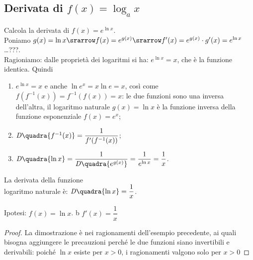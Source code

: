 \subsection{Derivata di $f(x)=\log_a x$}
\label{}
\begin{esempio}
  Calcola la derivata di $f(x)=e^{\ln x}$.\\
  Poniamo $g(x)=\ln x\srarrow f(x)=e^{g(x)}\srarrow f'(x)=e^{g(x)}\cdot 
g'(x)=
  e^{\ln x}$ \dots ???.\\
  Ragioniamo: dalle proprietà
  dei logaritmi si ha: $e^{\ln x} =x$, che è la funzione identica. Quindi
  \begin{enumerate}[noitemsep]
    \item $e^{\ln x} =x$ e anche $\ln e^x= x\ln e=x$, così come 
    $f(f^{-1}(x))=f^{-1}(f(x))=x$: le due funzioni sono una inversa 
dell'altra,
    il logaritmo naturale $g(x)=\ln x$ è la funzione inversa della
    funzione esponenziale $f(x)=e^x$;
    \item $\mathit{D}\quadra{f^{-1}(x)}=\dfrac{1}{f'(f^{-1}(x))}$;
    \item $\mathit{D}\quadra{\ln x}=\dfrac{1}{\mathit{D}\quadra{e^{g(x)}}}
    =\dfrac{1}{e^{\ln x}}=\dfrac{1}{x}$.
  \end{enumerate}
\end{esempio}

\begin{inaccessibleblock}
  \begin{minipage}[]{.55\textwidth}
   \begin{center} \esplog \end{center}
 \end{minipage} 
  \hfill
 \begin{minipage}[]{.42\textwidth}
 \begin{teorema}
  La derivata della funzione \\
  logaritmo naturale è: $\mathit{D}\quadra{\ln x}=
  \dfrac{1}{x}$.
\end{teorema}
\noindent Ipotesi: $f(x)=\ln x$. \hspace{1cm}b $f'(x)=\dfrac{1}{x}$
\begin{proof}
La dimostrazione è nei ragionamenti dell'esempio precedente, ai quali 
bisogna 
aggiungere le precauzioni perché le due funzioni siano invertibili e 
derivabili: 
poiché $\ln x$ esiste per $x>0$, i ragionamenti valgono solo per $x>0$
\end{proof} 
 \end{minipage}
\end{inaccessibleblock}
\label{}
\\

